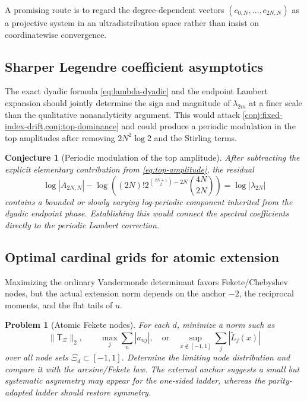 \documentclass[11pt,oneside]{article}
\newtheorem{conjecture}[theorem]{Conjecture}
\newtheorem{problem}[theorem]{Problem}
\theoremstyle{definition}
\theoremstyle{remark}
\begin{document}
A promising route is to regard the degree-dependent vectors
$(c_{0,N},\ldots,c_{2N,N})$ as a projective system in an ultradistribution
space rather than insist on coordinatewise convergence.

\subsection{Sharper Legendre coefficient asymptotics}
The exact dyadic formula \eqref{eq:lambda-dyadic} and the endpoint
Lambert expansion should jointly determine the sign and magnitude of
$\lambda_{2m}$ at a finer scale than the qualitative nonanalyticity argument.
This would attack \cref{conj:fixed-index-drift,conj:top-dominance} and could
produce a periodic modulation in the top amplitudes after removing
$2N^2\log2$ and the Stirling terms.

\begin{conjecture}[Periodic modulation of the top amplitude]
After subtracting the explicit elementary contribution from
\eqref{eq:top-amplitude}, the residual
\begin{equation}
 \log|A_{2N,N}|-
 \log\!\left((2N)!2^{\binom{2N+1}{2}-2N}\binom{4N}{2N}\right)
 =\log|\lambda_{2N}|
 \label{eq:top-residual}
\end{equation}
contains a bounded or slowly varying log-periodic component inherited from
the dyadic endpoint phase.  Establishing this would connect the spectral
coefficients directly to the periodic Lambert correction.
\end{conjecture}

\subsection{Optimal cardinal grids for atomic extension}
Maximizing the ordinary Vandermonde determinant favors Fekete/Chebyshev
nodes, but the actual extension norm depends on the anchor $-2$, the
reciprocal moments, and the flat tails of $u$.

\begin{problem}[Atomic Fekete nodes]
For each $d$, minimize a norm such as
\begin{equation}
 \|\mathsf T_\Xi\|_2,
 \qquad
 \max_j\sum_n|a_{nj}|,
 \quad\text{or}\quad
 \sup_{x\notin[-1,1]}\sum_j|\widetilde L_j(x)|
 \label{eq:atomic-node-objectives}
\end{equation}
over all node sets $\Xi_d\subset[-1,1]$.  Determine the limiting node
distribution and compare it with the arcsine/Fekete law.  The external
anchor suggests a small but systematic asymmetry may appear for the
one-sided ladder, whereas the parity-adapted ladder should restore symmetry.
\end{problem}
\end{document}
